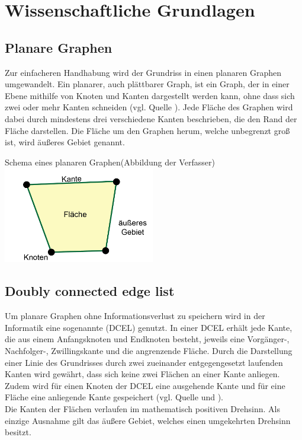 \chapter{Wissenschaftliche Grundlagen}
\section{Planare Graphen}
Zur einfacheren Handhabung wird der Grundriss in einen planaren Graphen umgewandelt. 
Ein planarer, auch plättbarer Graph, ist ein Graph, der in einer Ebene mithilfe von Knoten und Kanten dargestellt werden kann, ohne dass sich zwei oder mehr Kanten schneiden (vgl. Quelle \cite{planarGraph}). 
Jede Fläche des Graphen wird dabei durch mindestens drei verschiedene Kanten beschrieben, die den Rand der Fläche darstellen. 
Die Fläche um den Graphen herum, welche unbegrenzt groß ist, wird äußeres Gebiet genannt.
\begin{Bild}{Schema eines planaren Graphen(Abbildung der Verfasser)}
	\includegraphics[width = 250px]{Bilder/planarerGraph-11}
\end{Bild}

\section{Doubly connected edge list}
Um planare Graphen ohne Informationsverlust zu speichern wird in der Informatik eine sogenannte  (DCEL) genutzt.
In einer DCEL erhält jede Kante, die aus einem Anfangsknoten und Endknoten besteht, jeweils eine Vorgänger-, Nachfolger-, Zwillingskante und die angrenzende Fläche. 
Durch die Darstellung einer Linie des Grundrisses durch zwei zueinander entgegengesetzt laufenden Kanten wird gewährt, dass sich keine zwei Flächen an einer Kante anliegen.\\
Zudem wird für einen Knoten der DCEL eine ausgehende Kante und für eine Fläche eine anliegende Kante gespeichert (vgl. Quelle \cite{dcel} und \cite{dcelwiki}). \\
Die Kanten der Flächen verlaufen im mathematisch positiven Drehsinn.
Als einzige Ausnahme gilt das äußere Gebiet, welches einen umgekehrten Drehsinn besitzt.

